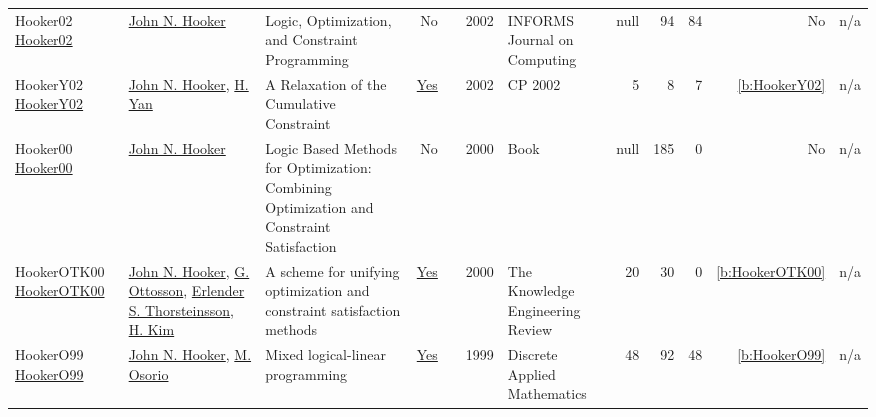 {\begin{longtable}{>{\raggedright\arraybackslash}p{3cm}>{\raggedright\arraybackslash}p{6cm}>{\raggedright\arraybackslash}p{6.5cm}rrrp{2.5cm}rrrrr}
Hooker02 \href{http://dx.doi.org/10.1287/ijoc.14.4.295.2828}{Hooker02} & \hyperref[auth:a161]{John N. Hooker} & Logic, Optimization, and Constraint Programming & No & \cite{Hooker02} & 2002 & INFORMS Journal on Computing & null & 94 & 84 & No & n/a\\
HookerY02 \href{https://doi.org/10.1007/3-540-46135-3_46}{HookerY02} & \hyperref[auth:a161]{John N. Hooker}, \hyperref[auth:a293]{H. Yan} & A Relaxation of the Cumulative Constraint & \href{../works/HookerY02.pdf}{Yes} & \cite{HookerY02} & 2002 & CP 2002 & 5 & 8 & 7 & \ref{b:HookerY02} & n/a\\
Hooker00 \href{http://dx.doi.org/10.1002/9781118033036}{Hooker00} & \hyperref[auth:a161]{John N. Hooker} & Logic Based Methods for Optimization: Combining Optimization and Constraint Satisfaction & No & \cite{Hooker00} & 2000 & Book & null & 185 & 0 & No & n/a\\
HookerOTK00 \href{http://dx.doi.org/10.1017/s0269888900001077}{HookerOTK00} & \hyperref[auth:a161]{John N. Hooker}, \hyperref[auth:a859]{G. Ottosson}, \hyperref[auth:a1208]{Erlender S. Thorsteinsson}, \hyperref[auth:a1209]{H. Kim} & A scheme for unifying optimization and constraint satisfaction methods & \href{../works/HookerOTK00.pdf}{Yes} & \cite{HookerOTK00} & 2000 & The Knowledge Engineering Review & 20 & 30 & 0 & \ref{b:HookerOTK00} & n/a\\
HookerO99 \href{http://dx.doi.org/10.1016/s0166-218x(99)00100-6}{HookerO99} & \hyperref[auth:a161]{John N. Hooker}, \hyperref[auth:a1169]{M. Osorio} & Mixed logical-linear programming & \href{../works/HookerO99.pdf}{Yes} & \cite{HookerO99} & 1999 & Discrete Applied Mathematics & 48 & 92 & 48 & \ref{b:HookerO99} & n/a\\
\end{longtable}
}

\clearpage
